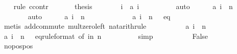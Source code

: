 \begin{isabellebody}
\ \ \isamarkupfalse%
\ {\isacharparenleft}rule\ ccontr{\isacharparenright}\isanewline
\ \ \ \ \isamarkupfalse%
\ {\isachardoublequoteopen}{\isasymnot}\ {\isacharquery}thesis{\isachardoublequoteclose}\isanewline
\ \ \ \ \isamarkupfalse%
\ \isamarkupfalse%
\ i\ \ {\isachardoublequoteopen}{\isacharquery}a\ i\ {\isacharequal}\ {}{\isachardoublequoteclose}\isanewline
\ \ \ \ \ \ \isamarkupfalse%
\ auto\isanewline
\ \ \ \ \isamarkupfalse%
\ {\isachardoublequoteopen}{\isacharquery}a\ {\isacharparenleft}i\ {\isacharplus}\ n{\isacharparenright}\ {\isacharequal}\ {}{\isachardoublequoteclose}\isanewline
\ \ \ \ \ \ \isamarkupfalse%
\ auto\isanewline
\ \ \ \ \isamarkupfalse%
\ {\isachardoublequoteopen}{\isacharquery}a\ {\isacharparenleft}i\ {\isacharplus}\ n\ {\isacharplus}\ {}{\isacharparenright}\ {\isacharequal}\ {}{\isachardoublequoteclose}\ \isanewline
\ \ \ \ \ \ \isamarkupfalse%
\ {\isacharbackquoteopen}{\isacharquery}a\ {\isacharparenleft}i\ {\isacharplus}\ n{\isacharparenright}\ {\isacharequal}\ {}{\isacharbackquoteclose}\ eq\isanewline
\ \ \ \ \ \ \isamarkupfalse%
\ {\isacharparenleft}metis\ add{\isachardot}commute\ mult{\isacharunderscore}zero{\isacharunderscore}left\ nat{\isacharunderscore}arith{\isachardot}rule{}{\isacharparenright}\isanewline
\ \ \ \ \isamarkupfalse%
\isanewline
\ \ \ \ \isamarkupfalse%
\ {\isachardoublequoteopen}{\isacharquery}a\ {\isacharparenleft}i\ {\isacharplus}\ n\ {\isacharplus}\ {}{\isacharparenright}\ {\isacharequal}\ {}{\isachardoublequoteclose}\isanewline
\ \ \ \ \ \ \isamarkupfalse%
\ {\isacharbackquoteopen}{\isacharquery}a\ {\isacharparenleft}i\ {\isacharplus}\ n{\isacharparenright}\ {\isacharequal}\ {}{\isacharbackquoteclose}\ eq{\isacharbrackleft}rule{\isacharunderscore}format{\isacharcomma}\ of\ {\isachardoublequoteopen}i{\isacharplus}n{\isacharminus}{}{\isachardoublequoteclose}{\isacharbrackright}\ {\isacharbackquoteopen}n\ {\isasymge}\ {}{\isacharbackquoteclose}\isanewline
\ \ \ \ \ \ \isamarkupfalse%
\ simp\isanewline
\ \ \ \ \isamarkupfalse%
\isanewline
\ \ \ \ \isamarkupfalse%
\ False\isanewline
\ \ \ \ \ \ \isamarkupfalse%
\ no{\isacharunderscore}pos{\isacharunderscore}pos\isanewline

\end{isabellebody}
